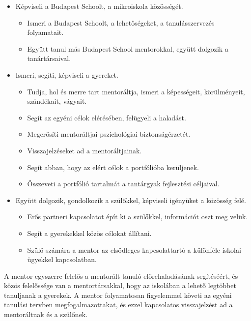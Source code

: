 \begin{itemize}
  \item Képviseli a Budapest Schoolt, a mikroiskola közösségét.
        \begin{itemize}
          \item Ismeri a Budapest Schoolt, a lehetőségeket, a tanulásszervezés
                folyamatait.
          \item Együtt tanul más Budapest School mentorokkal, együtt dolgozik a
                tanártársaival.
        \end{itemize}

  \item Ismeri, segíti, képviseli a gyereket.
        \begin{itemize}
          \item  Tudja, hol és merre tart mentoráltja, ismeri a képességeit,
                körülményeit, szándékait, vágyait.
          \item    Segít az egyéni célok elérésében, felügyeli a haladást.
          \item    Megerősíti mentoráltjai pszichológiai biztonságérzetét.
          \item   Visszajelzéseket ad a mentoráltjainak.
          \item    Segít abban, hogy az elért célok a portfólióba kerüljenek.
          \item    Összeveti a portfólió tartalmát a tantárgyak fejlesztési
                céljaival.
        \end{itemize}

  \item Együtt dolgozik, gondolkozik a szülőkkel, képviseli igényüket a
        közösség felé.
        \begin{itemize}
          \item Erős partneri kapcsolatot épít ki a szülőkkel, információt oszt meg
                velük.
          \item Segít a gyerekekkel közös célokat állítani.
          \item Szülő számára a mentor az elsődleges kapcsolattartó a különféle
                iskolai ügyekkel kapcsolatban.
        \end{itemize}

\end{itemize}

A mentor egyszerre felelős a mentorált tanuló előrehaladásának segítéséért,
és
közös felelőssége van a mentortársakkal, hogy az iskolában a lehető legtöbbet
tanuljanak a gyerekek. A mentor folyamatosan figyelemmel követi az egyéni
tanulási tervben megfogalmazottakat, és ezzel kapcsolatos visszajelzést ad a
mentoráltnak és a szülőnek.

